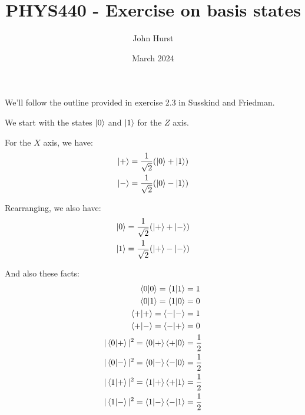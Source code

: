 \documentclass[12pt]{extarticle}
\title{PHYS440 - Exercise on basis states}
\author{John Hurst}
\date{March 2024}
\begin{document}
\maketitle



We'll follow the outline provided in exercise 2.3 in Susskind and Friedman\cite{susskind2014}.

We start with the states $\ket{0}$ and $\ket{1}$ for the $Z$ axis.

For the $X$ axis, we have:
\begin{align*}
\ket{+} & = \frac{1}{\sqrt{2}}(\ket{0} + \ket{1}) \\
\ket{-} & = \frac{1}{\sqrt{2}}(\ket{0} - \ket{1})
\end{align*}

Rearranging, we also have:
\begin{align*}
\ket{0} & = \frac{1}{\sqrt{2}}(\ket{+} + \ket{-}) \\
\ket{1} & = \frac{1}{\sqrt{2}}(\ket{+} - \ket{-})
\end{align*}

And also these facts:
\begin{align*}
\innerproduct{0}{0} = \innerproduct{1}{1} & = 1 \\
\innerproduct{0}{1} = \innerproduct{1}{0} & = 0 \\
\innerproduct{+}{+} = \innerproduct{-}{-} & = 1 \\
\innerproduct{+}{-} = \innerproduct{-}{+} & = 0 \\
|\innerproduct{0}{+}|^2 = \innerproduct{0}{+}\innerproduct{+}{0} & = \frac{1}{2} \\
|\innerproduct{0}{-}|^2 = \innerproduct{0}{-}\innerproduct{-}{0} & = \frac{1}{2} \\
|\innerproduct{1}{+}|^2 = \innerproduct{1}{+}\innerproduct{+}{1} & = \frac{1}{2} \\
|\innerproduct{1}{-}|^2 = \innerproduct{1}{-}\innerproduct{-}{1} & = \frac{1}{2}
\end{align*}
\end{document}
